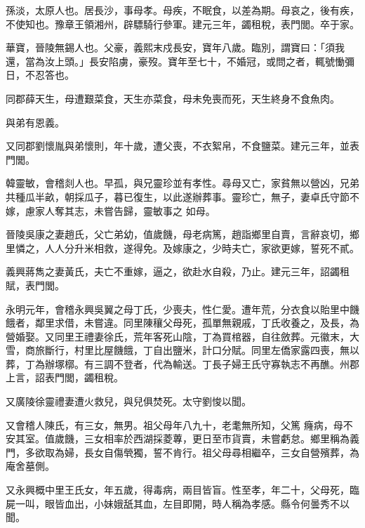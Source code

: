 \begin{pinyinscope}
 孫淡，太原人也。居長沙，事母孝。母疾，不眠食，以差為期。母哀之，後有疾，不使知也。豫章王領湘州，辟驃騎行參軍。建元三年，蠲租稅，表門閭。卒于家。



 華寶，晉陵無錫人也。父豪，義熙末戍長安，寶年八歲。臨別，謂寶曰：「須我還，當為汝上頭。」長安陷虜，豪歿。寶年至七十，不婚冠，或問之者，輒號慟彌日，不忍答也。



 同郡薛天生，母遭艱菜食，天生亦菜食，母未免喪而死，天生終身不食魚肉。



 與弟有恩義。



 又同郡劉懷胤與弟懷則，年十歲，遭父喪，不衣絮帛，不食鹽菜。建元三年，並表門閭。



 韓靈敏，會稽剡人也。早孤，與兄靈珍並有孝性。尋母又亡，家貧無以營凶，兄弟共種瓜半畝，朝採瓜子，暮已復生，以此遂辦葬事。靈珍亡，無子，妻卓氏守節不嫁，慮家人奪其志，未嘗告歸，靈敏事之
 如母。



 晉陵吳康之妻趙氏，父亡弟幼，值歲饑，母老病篤，趙詣鄉里自賣，言辭哀切，鄉里憐之，人人分升米相救，遂得免。及嫁康之，少時夫亡，家欲更嫁，誓死不貳。



 義興蔣雋之妻黃氏，夫亡不重嫁，逼之，欲赴水自殺，乃止。建元三年，詔蠲租賦，表門閭。



 永明元年，會稽永興吳翼之母丁氏，少喪夫，性仁愛。遭年荒，分衣食以貽里中饑餓者，鄰里求借，未嘗違。同里陳穰父母死，孤單無親戚，丁氏收養之，及長，為營婚娶。又同里王禮妻徐氏，荒年客死山陰，丁為買棺器，自往斂葬。元徽末，大雪，商旅斷行，村里比屋饑餓，丁自出鹽米，計口分賦。同里左僑家露四喪，無以葬，丁為辦塚槨。有三調不登者，代為輸送。丁長子婦王氏守寡執志不再醮。州郡上言，詔表門閭，蠲租稅。



 又廣陵徐靈禮妻遭火救兒，與兒俱焚死。太守劉悛以聞。



 又會稽人陳氏，有三女，無男。祖父母年八九十，老耄無所知，父篤
 癃病，母不安其室。值歲饑，三女相率於西湖採菱蓴，更日至市貨賣，未嘗虧怠。鄉里稱為義門，多欲取為婦，長女自傷煢獨，誓不肯行。祖父母尋相繼卒，三女自營殯葬，為庵舍墓側。



 又永興概中里王氏女，年五歲，得毒病，兩目皆盲。性至孝，年二十，父母死，臨屍一叫，眼皆血出，小妹娥舐其血，左目即開，時人稱為孝感。縣令何曇秀不以聞。




\end{pinyinscope}
